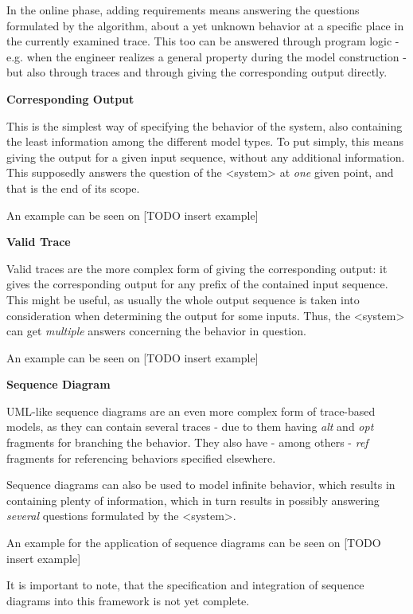 In the online phase, adding requirements means answering the questions formulated by the algorithm, about a yet unknown behavior at a specific place in the currently examined trace. This too can be answered through program logic - e.g. when the engineer realizes a general property during the model construction - but also through traces and through giving the corresponding output directly.

\textbf{Corresponding Output}

This is the simplest way of specifying the behavior of the system, also containing the least information among the different model types. To put simply, this means giving the output for a given input sequence, without any additional information. This supposedly answers the question of the <system> at \textit{one} given point, and that is the end of its scope.

An example can be seen on [TODO insert example]

\textbf{Valid Trace}

Valid traces are the more complex form of giving the corresponding output: it gives the corresponding output for any prefix of the contained input sequence. This might be useful, as usually the whole output sequence is taken into consideration when determining the output for some inputs. Thus, the <system> can get \textit{multiple} answers concerning the behavior in question.

An example can be seen on [TODO insert example]

\textbf{Sequence Diagram}

UML-like sequence diagrams are an even more complex form of trace-based models, as they can contain several traces - due to them having \textit{alt} and \textit{opt} fragments for branching the behavior. They also have - among others - \textit{ref} fragments for referencing behaviors specified elsewhere.

Sequence diagrams can also be used to model infinite behavior, which results in containing plenty of information, which in turn results in possibly answering \textit{several} questions formulated by the <system>.

An example for the application of sequence diagrams can be seen on [TODO insert example]

It is important to note, that the specification and integration of sequence diagrams into this framework is not yet complete. 

